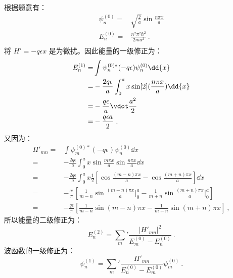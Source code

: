 \subsection{ }
根据题意有：
\begin{equation}
\begin{aligned}
\psi^{(0)}_{n} =& \sqrt{\frac{2}{a}} \sin{\frac{n \pi x}{a}} \\
E^{(0)}_{n} =& \frac{n^{2} \pi^{2} \hbar^{2}}{2ma^{2}}~. \\
\end{aligned}
\end{equation}
将 $H' = -q \epsilon x$ 是为微扰。因此能量的一级修正为：
\begin{equation}
\begin{aligned}
E^{(1)}_{n} =& \int \psi_{n}^{(0)*} (-q\epsilon) \psi_{n}^{(0)} \dd{x} \\
=& -\frac{2q\epsilon}{a} \int^{a}_{0} x \sin[2](\frac{n \pi x}{a}) \dd{x} \\
=& -\frac{q\epsilon}{a} \vdot \frac{a^{2}}{2} \\
=& -\frac{q \epsilon a}{2}~.
\end{aligned}
\end{equation}
又因为：
\begin{equation}
\begin{aligned}
H'_{mn} =& \int \psi_{m}^{(0)*} (-q\epsilon) \psi_{n}^{(0)} \dd{x} \\
=& -\frac{2q\epsilon}{a} \int^{a}_{0} x \sin{\frac{m \pi x}{a}} \sin{\frac{n \pi x}{a}} \dd{x} \\
=& -\frac{2q\epsilon}{a} \int^{a}_{0} x \frac{1}{2} \left[\cos{\frac{(m-n)\pi x}{a}} - \cos{\frac{(m+n)\pi x}{a}} \right] \dd{x} \\
=& -\frac{q\epsilon}{\pi} \left[\frac{1}{m-n}\sin{\frac{(m-n)\pi x}{a}} \Big|^{a}_{0} - \frac{1}{m+n}\sin{\frac{(m+n)\pi x}{a}} \Big|^{a}_{0} \right] \\
=& -\frac{q\epsilon}{\pi} \left[\frac{1}{m-n}\sin{(m-n)\pi x} - \frac{1}{m+n}\sin{(m+n)\pi x}  \right]~,
\end{aligned}
\end{equation}
所以能量的二级修正为：
\begin{equation}
E^{(2)}_{n} = \sum_{m}' \frac{\left|H'_{mn} \right|^{2}}{E^{(0)}_{m} - E^{(0)}_{n}}~.
\end{equation}
波函数的一级修正为：
\begin{equation}
\psi^{(1)}_{n} = \sum_{m}'\frac{H'_{mn}}{E^{(0)}_{n} - E^{(0)}_{m}} \psi^{(0)}_{m}~.
\end{equation}

